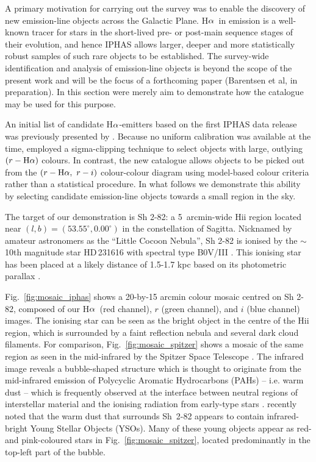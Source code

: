 \documentclass[useAMS,usenatbib]{mn2e}
\def\ha{\mbox{H$\rm \alpha$}}
\begin{document}
A primary motivation for carrying out the survey 
was to enable the discovery 
of new emission-line objects
across the Galactic Plane.
\ha\ in emission is a well-known tracer
for stars in the short-lived pre- or
post-main sequence stages of their evolution,
and hence IPHAS allows larger, deeper
and more statistically robust samples
of such rare objects to be established.
The survey-wide identification and analysis 
of emission-line objects is beyond the scope
of the present work and will be the focus
of a forthcoming paper (Barentsen et al, in preparation).
In this section were merely aim to demonstrate
how the catalogue may be used for this purpose.

An initial list of candidate \ha-emitters
based on the first IPHAS data release was previously
presented by \cite{Witham2008}. 
Because no uniform calibration was available
at the time, \citeauthor{Witham2008} employed 
a sigma-clipping technique to select objects with
large, outlying $(r-\ha)$ colours.
In contrast, the new catalogue
allows objects to be picked out
from the $(r-\ha,\ r-i)$ colour-colour diagram
using model-based colour criteria
rather than a statistical procedure.
In what follows we demonstrate this ability 
by selecting candidate emission-line objects
towards a small region in the sky.

The target of our demonstration is Sh 2-82:
a 5~arcmin-wide H{\sc ii} region located near $(l,b)=(53.55^\circ, 0.00^\circ)$
in the constellation of Sagitta.
Nicknamed by amateur astronomers as the ``Little Cocoon Nebula'',
Sh 2-82 is ionised by 
the $\sim$10th magnitude star HD\,231616
with spectral type B0V/III
\citep{Georgelin1973,Mayer1973,Hunter1990}.
This ionising star has been placed 
at a likely distance of 1.5-1.7 kpc
based on its photometric parallax
\citep{Mayer1973,Lahulla1985,Hunter1990}.

Fig.~\ref{fig:mosaic_iphas} shows a 20-by-15 arcmin
colour mosaic centred on Sh 2-82,
composed of our \ha\ (red channel),
$r$ (green channel),
and $i$ (blue channel) images.
The ionising star can be seen as the bright object
in the centre of the H{\sc ii} region,
which is surrounded by a faint reflection nebula
and several dark cloud filaments.
For comparison, Fig.~\ref{fig:mosaic_spitzer} shows
a mosaic of the same region 
as seen in the mid-infrared by the Spitzer Space Telescope \citep[GLIMPSE survey;][]{Benjamin2003,Churchwell2009}.
The infrared image reveals a bubble-shaped structure
which is thought to originate from the
mid-infrared emission of Polycyclic Aromatic Hydrocarbons (PAHs)
-- i.e. warm dust --
which is frequently observed
at the interface between neutral regions of interstellar material
and the ionising radiation from early-type stars \citep{Churchwell2006}.
\cite{Yu2012}
recently noted that the warm dust
that surrounds Sh~2-82 
appears to contain infrared-bright
Young Stellar Objects (YSOs).
Many of these young objects 
appear as red- and pink-coloured stars
in Fig.~\ref{fig:mosaic_spitzer},
located predominantly in the top-left part
of the bubble.
\end{document}
